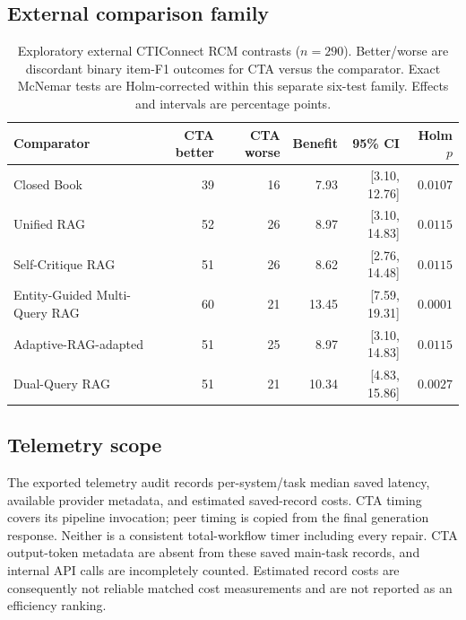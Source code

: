 \subsection{External comparison family}\label{app:external-tests}

\begin{table}[t]
\centering
\small
\caption{Exploratory external CTIConnect RCM contrasts ($n=290$). Better/worse are discordant binary item-F1 outcomes for CTA versus the comparator. Exact McNemar tests are Holm-corrected within this separate six-test family. Effects and intervals are percentage points.}
\label{tab:external-tests}
\setlength{\tabcolsep}{5pt}
\begin{tabular}{@{}lrrrrr@{}}
\toprule
Comparator & CTA better & CTA worse & Benefit & 95\% CI & Holm $p$ \\
\midrule
Closed Book & 39 & 16 & 7.93 & [3.10, 12.76] & $0.0107$ \\
Unified RAG & 52 & 26 & 8.97 & [3.10, 14.83] & $0.0115$ \\
Self-Critique RAG & 51 & 26 & 8.62 & [2.76, 14.48] & $0.0115$ \\
Entity-Guided Multi-Query RAG & 60 & 21 & 13.45 & [7.59, 19.31] & $0.0001$ \\
Adaptive-RAG-adapted & 51 & 25 & 8.97 & [3.10, 14.83] & $0.0115$ \\
Dual-Query RAG & 51 & 21 & 10.34 & [4.83, 15.86] & $0.0027$ \\
\bottomrule
\end{tabular}

\end{table}

\subsection{Telemetry scope}\label{app:telemetry}

The exported telemetry audit records per-system/task median saved latency, available provider metadata, and estimated saved-record costs. CTA timing covers its pipeline invocation; peer timing is copied from the final generation response. Neither is a consistent total-workflow timer including every repair. CTA output-token metadata are absent from these saved main-task records, and internal API calls are incompletely counted. Estimated record costs are consequently not reliable matched cost measurements and are not reported as an efficiency ranking.




